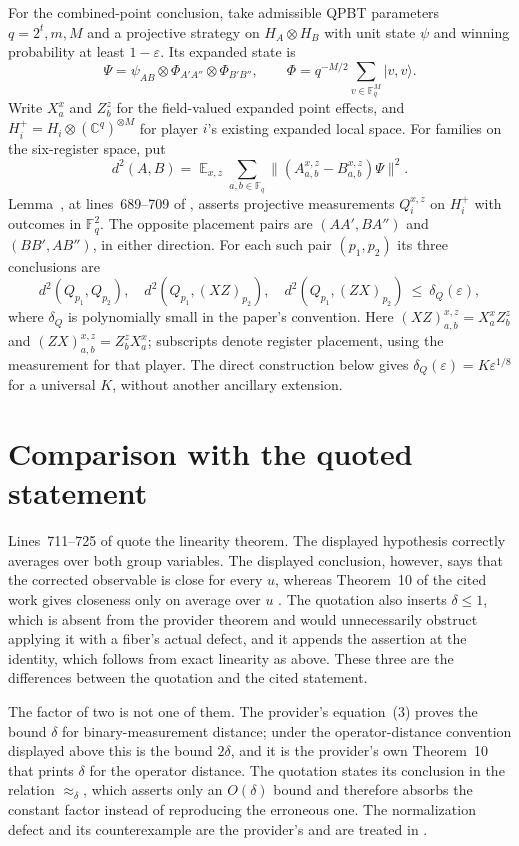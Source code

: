 \documentclass[11pt]{article}
\begin{document}
For the combined-point conclusion, take admissible QPBT parameters
$q=2^t,m,M$ and a projective strategy on $H_A\otimes H_B$ with unit state
$\psi$ and winning probability at least $1-\varepsilon$.  Its expanded state is
\[
 \Psi=\psi_{AB}\otimes\Phi_{A'A''}\otimes\Phi_{B'B''},\qquad
 \Phi=q^{-M/2}\sum_{v\in\mathbb F_q^M}|v,v\rangle.
\]
Write $X_a^x$ and $Z_b^z$ for the field-valued expanded point effects, and
$H_i^+=H_i\otimes(\mathbb C^q)^{\otimes M}$ for player $i$'s existing expanded
local space.  For families on the six-register space, put
\[
 d^2(A,B)=\mathop{\mathbb E}_{x,z}\sum_{a,b\in\mathbb F_q}
   \|(A^{x,z}_{a,b}-B^{x,z}_{a,b})\Psi\|^2.
\]
Lemma~, at lines~689--709 of
, asserts
projective measurements $Q_i^{x,z}$ on $H_i^+$ with outcomes in
$\mathbb F_q^2$.  The opposite placement pairs are $(AA',BA'')$ and
$(BB',AB'')$, in either direction.  For each such pair $(p_1,p_2)$ its three
conclusions are
\[
 d^2(Q_{p_1},Q_{p_2}),\quad
 d^2(Q_{p_1},(XZ)_{p_2}),\quad
 d^2(Q_{p_1},(ZX)_{p_2})\ \leq\ \delta_Q(\varepsilon),
\]
where $\delta_Q$ is polynomially small in the paper's convention.  Here
$(XZ)^{x,z}_{a,b}=X_a^xZ_b^z$ and $(ZX)^{x,z}_{a,b}=Z_b^zX_a^x$;
subscripts denote register placement, using the measurement for that player.
The direct construction below gives $\delta_Q(\varepsilon)=K\varepsilon^{1/8}$
for a universal $K$, without another ancillary extension.

\section{Comparison with the quoted statement}

Lines~711--725 of
 quote the
linearity theorem.  The displayed hypothesis correctly averages over both
group variables.  The displayed conclusion, however, says that the corrected
observable is close for every $u$, whereas Theorem~10 of the cited work gives
closeness only on average over $u$ \cite{Natarajan2017Linearity}.  The
quotation also inserts $\delta\leq1$, which is absent from the provider theorem
and would unnecessarily obstruct applying it with a fiber's actual defect, and
it appends the assertion at the identity, which follows from exact linearity as
above.  These three are the differences between the quotation and the cited
statement.

The factor of two is not one of them.  The provider's equation~(3) proves the
bound $\delta$ for binary-measurement distance; under the operator-distance
convention displayed above this is the bound $2\delta$, and it is the
provider's own Theorem~10 that prints $\delta$ for the operator distance.  The
quotation states its conclusion in the relation $\approx_\delta$, which asserts
only an $O(\delta)$ bound and therefore absorbs the constant factor instead of
reproducing the erroneous one.  The normalization defect and its counterexample
are the provider's and are treated in
.
\end{document}
